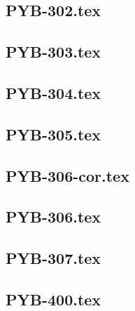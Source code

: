 \renewcommand{\xxexo}{PYB-302.tex} 
\subsection*{\xxexo} 
\graphicspath{{../../exospython_bases/equadiffs/\xxexo/}}
 
 
\renewcommand{\xxexo}{PYB-303.tex} 
\subsection*{\xxexo} 
\graphicspath{{../../exospython_bases/equadiffs/\xxexo/}}
 
 
\renewcommand{\xxexo}{PYB-304.tex} 
\subsection*{\xxexo} 
\graphicspath{{../../exospython_bases/equadiffs/\xxexo/}}
 
 
\renewcommand{\xxexo}{PYB-305.tex} 
\subsection*{\xxexo} 
\graphicspath{{../../exospython_bases/equadiffs/\xxexo/}}
 
 
\renewcommand{\xxexo}{PYB-306-cor.tex} 
\subsection*{\xxexo} 
\graphicspath{{../../exospython_bases/equadiffs/\xxexo/}}
 
 
\renewcommand{\xxexo}{PYB-306.tex} 
\subsection*{\xxexo} 
\graphicspath{{../../exospython_bases/equadiffs/\xxexo/}}
 
 
\renewcommand{\xxexo}{PYB-307.tex} 
\subsection*{\xxexo} 
\graphicspath{{../../exospython_bases/equadiffs/\xxexo/}}
 
 
\renewcommand{\xxexo}{PYB-400.tex} 
\subsection*{\xxexo} 
\graphicspath{{../../exospython_bases/equadiffs/\xxexo/}}
 
 
